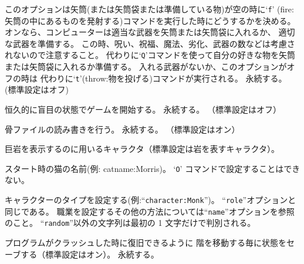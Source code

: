 このオプションは矢筒(または矢筒袋または準備している物)が空の時に`{\tt f}'
(fire:矢筒の中にあるものを発射する)コマンドを実行した時にどうするかを決める。
オンなら、コンピューターは適当な武器を矢筒または矢筒袋に入れるか、
適切な武器を準備する。
この時、呪い、祝福、魔法、劣化、武器の数などは考慮されないので注意すること。
代わりに`{\tt Q}'コマンドを使って自分の好きな物を矢筒または矢筒袋に入れるか準備する。
入れる武器がないか、このオプションがオフの時は
代わりに`{\tt t}'(throw:物を投げる)コマンドが実行される。
永続する。
(標準設定はオフ)
\item[\ib{blind}]
恒久的に盲目の状態でゲームを開始する。
永続する。
（標準設定はオフ）
\item[\ib{bones}]
骨ファイルの読み書きを行う。
永続する。
（標準設定はオン）
\item[\ib{boulder}]
巨岩を表示するのに用いるキャラクタ（標準設定は岩を表すキャラクタ）。
\item[\ib{catname}]
スタート時の猫の名前(例: catname:Morris)。
`{\tt O}' コマンドで設定することはできない。
\item[\ib{character}]
キャラクターのタイプを設定する(例:``{\tt character:Monk}'')。
``{\tt role}''オプションと同じである。
職業を設定するその他の方法については``{\tt name}''オプションを参照のこと。
``{\tt random}''以外の文字列は最初の 1 文字だけで判別される。
\item[\ib{checkpoint}]
プログラムがクラッシュした時に復旧できるように
階を移動する毎に状態をセーブする（標準設定はオン）。
永続する。
